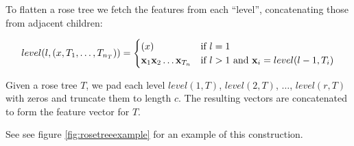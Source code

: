To flatten a rose tree we fetch the features from each ``level'', concatenating those from adjacent children:

\begin{equation*}
  level(l, (x, T_1, \dots, T_{n_T})) =
    \begin{cases}
      (x) & \text{if $l = 1$} \\
      \mathbf{x}_1 \mathbf{x}_2 \dots \mathbf{x}_{T_n} & \text{if $l > 1$ and $\mathbf{x}_i = level(l - 1, T_i)$}
    \end{cases}
\end{equation*}

Given a rose tree $T$, we pad each level $level(1, T)$, $level(2, T)$, $\dots$, $level(r, T)$ with zeros and truncate them to length $c$. The resulting vectors are concatenated to form the feature vector for $T$.

See see figure \ref{fig:rosetreeexample} for an example of this construction.

